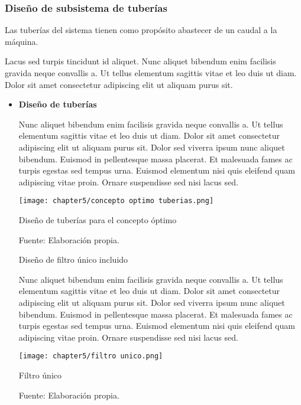 \subsubsection{Diseño de subsistema de tuberías}

Las tuberías del sistema tienen como propósito abastecer de un caudal a la máquina.

Lacus sed turpis tincidunt id aliquet. Nunc aliquet bibendum enim facilisis gravida neque convallis a. Ut tellus elementum sagittis vitae et leo duis ut diam. Dolor sit amet consectetur adipiscing elit ut aliquam purus sit. 

\begin{itemize}
	
	\item \textbf{Diseño de tuberías}
	
	Nunc aliquet bibendum enim facilisis gravida neque convallis a. Ut tellus elementum sagittis vitae et leo duis ut diam. Dolor sit amet consectetur adipiscing elit ut aliquam purus sit. Dolor sed viverra ipsum nunc aliquet bibendum. Euismod in pellentesque massa placerat. Et malesuada fames ac turpis egestas sed tempus urna. Euismod elementum nisi quis eleifend quam adipiscing vitae proin. Ornare suspendisse sed nisi lacus sed.
	
	\begin{myfigure}[H]
		\centering
		\texttt{[image: chapter5/concepto optimo tuberias.png]}
		\caption{Diseño de tuberías para el concepto óptimo}
		\begin{myflushleftportland}
			Fuente: Elaboración propia.
		\end{myflushleftportland}
		\label{fig:concepto optimo tuberias}
	\end{myfigure}

	Diseño de filtro único incluido
	
	Nunc aliquet bibendum enim facilisis gravida neque convallis a. Ut tellus elementum sagittis vitae et leo duis ut diam. Dolor sit amet consectetur adipiscing elit ut aliquam purus sit. Dolor sed viverra ipsum nunc aliquet bibendum. Euismod in pellentesque massa placerat. Et malesuada fames ac turpis egestas sed tempus urna. Euismod elementum nisi quis eleifend quam adipiscing vitae proin. Ornare suspendisse sed nisi lacus sed.	
	
	\begin{myfigure}[H]
		\centering
		\texttt{[image: chapter5/filtro unico.png]}
		\caption{Filtro único}
		\begin{myflushleftportland}
			Fuente: Elaboración propia.
		\end{myflushleftportland}
		\label{fig:filtro unico}
	\end{myfigure}


\end{itemize}
